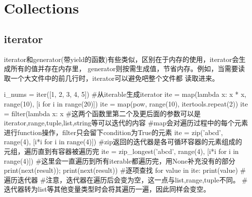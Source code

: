 \section{Collections}

  \subsection{iterator}
    iterator和generator(带yield的函数)有些类似，区别在于内存的使用，iterator会生成所有的值并存在内存里，
    generator则按需生成值，节省内存。例如，当需要读取一个大文件中的前几行时，iterator可以避免吧整个文件都
    读取进来。
    \begin{codeblock}[language=python, caption={iterator}]
      i_nums = iter([1, 2, 3, 4, 5]) #从iterable生成iterator
      ite = map(lambda x: x * x, range(10), [i for i in range(20)])
      ite = map(pow, range(10), itertools.repeat(2))
      ite = filter(lambda x: x %
      #这两个函数里第二个及更后面的参数可以是iterator,range,tuple,list,string等可以迭代的内容
      #map会对遍历过程中的每个元素进行function操作，filter只会留下condition为True的元素
      ite = zip('abcd', range(4), [i*i for i in range(4)])
      #zip返回的迭代器是各可循环容器的元素组成的元组，遍历直到有容器被遍历完
      ite = zip_longest('abcd', range(4), [i*i for i in range(4)])
      #这里会一直遍历到所有iterable都遍历完，用None补充没有的部分
      print(next(result)); print(next(result)) #逐项查找
      for value in ite:
        print(value) #遍历迭代器
      #注意，迭代器在遍历后会变为空，这一点与list,range,tuple不同。
      #迭代器转为list等其他变量类型时会将其遍历一遍，因此同样会变空。
    \end{codeblock}

